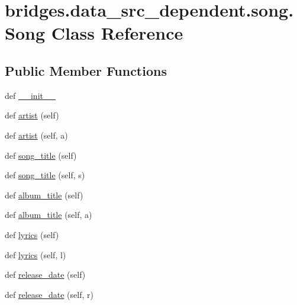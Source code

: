 \hypertarget{classbridges_1_1data__src__dependent_1_1song_1_1_song}{}\section{bridges.\+data\+\_\+src\+\_\+dependent.\+song.\+Song Class Reference}
\label{classbridges_1_1data__src__dependent_1_1song_1_1_song}
\subsection*{Public Member Functions}
\begin{DoxyCompactItemize}
\item 
def \hyperlink{classbridges_1_1data__src__dependent_1_1song_1_1_song_a7f7384595782d5a3a829aa9f96a92845}{\+\_\+\+\_\+init\+\_\+\+\_\+}
\item 
def \hyperlink{classbridges_1_1data__src__dependent_1_1song_1_1_song_a82ffeb5ab815a4e5028f113e8eb2a482}{artist} (self)
\item 
def \hyperlink{classbridges_1_1data__src__dependent_1_1song_1_1_song_a918ecca7107f6af77f5b15d2bee5ea98}{artist} (self, a)
\item 
def \hyperlink{classbridges_1_1data__src__dependent_1_1song_1_1_song_a1c34d8af79451417060ee5d1e860e31e}{song\+\_\+title} (self)
\item 
def \hyperlink{classbridges_1_1data__src__dependent_1_1song_1_1_song_aa1f51734629030528f5bc86a6b2478f1}{song\+\_\+title} (self, s)
\item 
def \hyperlink{classbridges_1_1data__src__dependent_1_1song_1_1_song_a5ecb8e966ffd3659875ed3b751ed294c}{album\+\_\+title} (self)
\item 
def \hyperlink{classbridges_1_1data__src__dependent_1_1song_1_1_song_a62f0c444ecc16f3d87cfd0b3e0d60b52}{album\+\_\+title} (self, a)
\item 
def \hyperlink{classbridges_1_1data__src__dependent_1_1song_1_1_song_a9f7ec8dec6e40fbac228631b23e1734c}{lyrics} (self)
\item 
def \hyperlink{classbridges_1_1data__src__dependent_1_1song_1_1_song_ab88a7122f8d962728e25fa0152dd8542}{lyrics} (self, l)
\item 
def \hyperlink{classbridges_1_1data__src__dependent_1_1song_1_1_song_af69707705b6d4fbba2884ca3a21343a4}{release\+\_\+date} (self)
\item 
def \hyperlink{classbridges_1_1data__src__dependent_1_1song_1_1_song_a213d73d84e0703204841567dcc2723f3}{release\+\_\+date} (self, r)
\end{DoxyCompactItemize}


